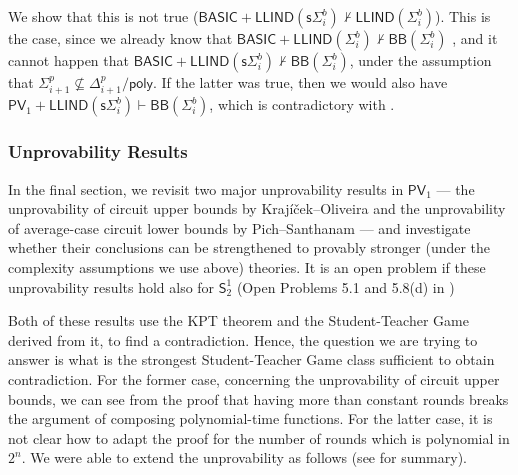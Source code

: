 \documentclass[11pt]{article}
\newcommand{\poly}{\mathsf{poly}}
\newcommand{\PV}{\mathsf{PV}}
\newcommand{\SOT}{\mathsf{S}^1_2}
\theoremstyle{definition}
\theoremstyle{definition}
\theoremstyle{remark}
\begin{document}
We show that this is not true ($\mathsf{BASIC}+\mathsf{LLIND}(\mathsf{s}\Sigma^b_i) \nvdash \mathsf{LLIND}(\Sigma^b_i)$). This is the case, since we already know that $\mathsf{BASIC}+\mathsf{LLIND}(\Sigma^b_i) \nvdash \mathsf{BB}(\Sigma^b_i)$ \cite{ALLEN19911}, and it cannot happen that $\mathsf{BASIC}+\mathsf{LLIND}(\mathsf{s}\Sigma^b_i) \nvdash \mathsf{BB}(\Sigma^b_i)$, under the assumption that $\Sigma^p_{i+1}\not\subseteq \Delta^p_{i+1}/\poly$.  If the latter was true, then we would also have $\PV_1+\mathsf{LLIND}(\mathsf{s}\Sigma^b_i) \vdash \mathsf{BB}(\Sigma^b_i)$, which is contradictory with .

\subsubsection{Unprovability Results} 

In the final section, we revisit two major unprovability results in $\PV_1$ — the unprovability of circuit upper bounds by Krajíček–Oliveira \cite{KO17} and the unprovability of average-case circuit lower bounds by Pich–Santhanam \cite{pichS21} — and investigate whether their conclusions can be strengthened to provably stronger (under the complexity assumptions we use above) theories. It is an open problem if these unprovability results hold also for $\SOT$ (Open Problems 5.1 and 5.8(d) in \cite{oli2025})

Both of these results use the KPT theorem and the Student-Teacher Game derived from it, to find a contradiction. Hence, the question we are trying to answer is what is the strongest Student-Teacher Game class sufficient to obtain contradiction. For the former case, concerning the unprovability of circuit upper bounds, we can see from the proof that having more than constant rounds breaks the argument of composing polynomial-time functions. For the latter case, it is not clear how to adapt the proof for the number of rounds which is polynomial in $2^n$. We were able to extend the unprovability as follows (see  for summary).
\end{document}
